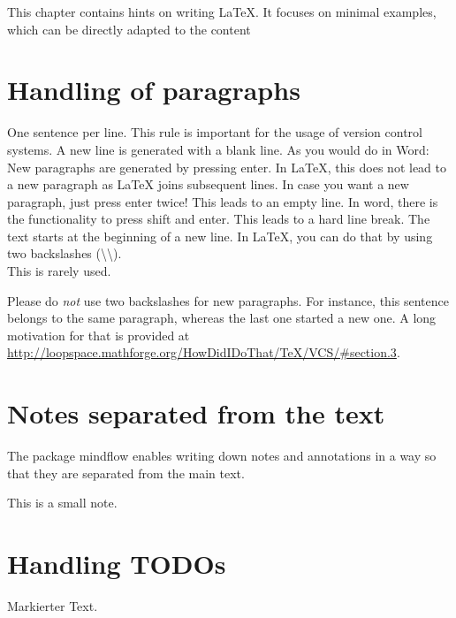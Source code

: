 \documentclass[
  numbers=noenddot,
  english,  %
  a4paper,  %
  twoside,  %
  bibliography=totoc,
  headsepline,
  cleardoublepage=empty,
  parskip=half,
  draft=false
]{scrbook}
\theoremstyle{break}
\newcommand{\textmarker}[1]{{\color{red} #1}\xspace}
\begin{document}
This chapter contains hints on writing LaTeX.
It focuses on minimal examples, which can be directly adapted to the content

\section{Handling of paragraphs}

\begin{ltgexample}
One sentence per line.
This rule is important for the usage of version control systems.
A new line is generated with a blank line.
As you would do in Word:
New paragraphs are generated by pressing enter.
In LaTeX, this does not lead to a new paragraph as LaTeX joins subsequent lines.
In case you want a new paragraph, just press enter twice!
This leads to an empty line.
In word, there is the functionality to press shift and enter.
This leads to a hard line break.
The text starts at the beginning of a new line.
In LaTeX, you can do that by using two backslashes (\textbackslash\textbackslash).
\\
This is rarely used.

Please do \textit{not} use two backslashes for new paragraphs.
For instance, this sentence belongs to the same paragraph, whereas the last one started a new one.
A long motivation for that is provided at \url{http://loopspace.mathforge.org/HowDidIDoThat/TeX/VCS/#section.3}.
\end{ltgexample}

\section{Notes separated from the text}

The package mindflow enables writing down notes and annotations in a way so that they are separated from the main text.

\begin{ltgexample}
\begin{mindflow}
This is a small note.
\end{mindflow}
\end{ltgexample}

\section{Handling TODOs}

\begin{ltgexample}
\textmarker{Markierter Text.}
\end{ltgexample}
\end{document}
